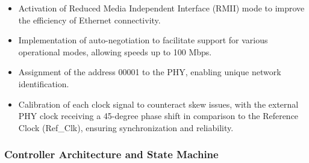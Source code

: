\begin{itemize}
    \item Activation of Reduced Media Independent Interface (RMII) mode to improve the efficiency of Ethernet connectivity.
    \item Implementation of auto-negotiation to facilitate support for various operational modes, allowing speeds up to 100 Mbps.
    \item Assignment of the address 00001 to the PHY, enabling unique network identification.
    \item Calibration of each clock signal to counteract skew issues, with the external PHY clock receiving a 45-degree phase shift in comparison to the Reference Clock (Ref\_Clk), ensuring synchronization and reliability.
\end{itemize}





\subsubsection{Controller Architecture and State Machine}

